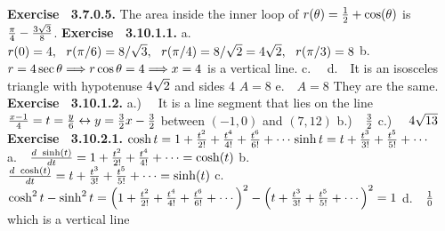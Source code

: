  {\noindent \protect \bf  Exercise ~3.7.0.5.} The area inside the inner loop of $r(\theta )=\protect \frac  {1}{2}+\protect \qopname  \relax o{cos}(\theta )$ is $\protect \frac  {\pi }{4}-\protect \frac  {3\protect \sqrt  {3}}{8}$. \protect \newline  \protect \newline  
 {\noindent \protect \bf  Exercise ~3.10.1.1.} a.~~ $r(0) = 4,~~r(\pi /6) = 8/\protect \sqrt  {3},~~r(\pi /4) =8/\protect \sqrt  {2}=4\protect \sqrt  {2},~~r(\pi /3)= 8 $ b.~~ $r=4\protect \qopname  \relax o{sec}{\theta } \DOTSB \protect \Relbar \protect \joinrel \Rightarrow r \protect \qopname  \relax o{cos}{\theta } = 4 \DOTSB \protect \Relbar \protect \joinrel \Rightarrow x=4$ is a vertical line. c.~~ d.~~It is an isosceles triangle with hypotenuse $4\protect \sqrt  {2}$ and sides 4 $A=8$ e.~~$A=8$ They are the same.  \protect \newline  \protect \newline  
 {\noindent \protect \bf  Exercise ~3.10.1.2.} a.)~~ It is a line segment that lies on the line $\protect \frac  {x-1}{4} = t = \protect \frac  {y}{6} \leftrightarrow y = \protect \frac  {3}{2} x - \protect \frac  {3}{2} $ between $(-1,0)$ and $(7,12)$ \protect \newline  b.)~~$\protect \frac  {3}{2}$ \protect \newline  c.)~~ $4\protect \sqrt  {13}$ \protect \newline  \protect \newline  
 {\noindent \protect \bf  Exercise ~3.10.2.1.} $\protect \qopname  \relax o{cosh}{t} = 1+\protect \frac  {t^2}{2!} + \protect \frac  {t^4}{4!}+\protect \frac  {t^6}{6!} + \protect \cdots  $\protect \newline  $\protect \qopname  \relax o{sinh}{t} = t + \protect \frac  {t^3}{3!} + \protect \frac  {t^5}{5!}+ \protect \cdots  $ \protect \newline  a.~~$\protect \frac  {d ~\protect \qopname  \relax o{sinh}(t)}{dt} = 1+\protect \frac  {t^2}{2!}+\protect \frac  {t^4}{4!} + \protect \cdots  =\protect \qopname  \relax o{cosh}(t)$ \protect \newline  b.~~$\protect \frac  {d ~\protect \qopname  \relax o{cosh}(t)}{dt} = t+\protect \frac  {t^3}{3!}+\protect \frac  {t^5}{5!} + \protect \cdots  =\protect \qopname  \relax o{sinh}(t)$ \protect \newline  c.~~$ \protect \qopname  \relax o{cosh}^2{t}- \protect \qopname  \relax o{sinh}^2{t} = \left (1+\protect \frac  {t^2}{2!} + \protect \frac  {t^4}{4!}+\protect \frac  {t^6}{6!} + \protect \cdots  \right )^2 - \left (t + \protect \frac  {t^3}{3!} + \protect \frac  {t^5}{5!}+ \protect \cdots  \right )^2 = 1 $ \protect \newline  d.~~$\protect \frac  {1}{0}$ which is a vertical line \protect \newline  \protect \newline  
